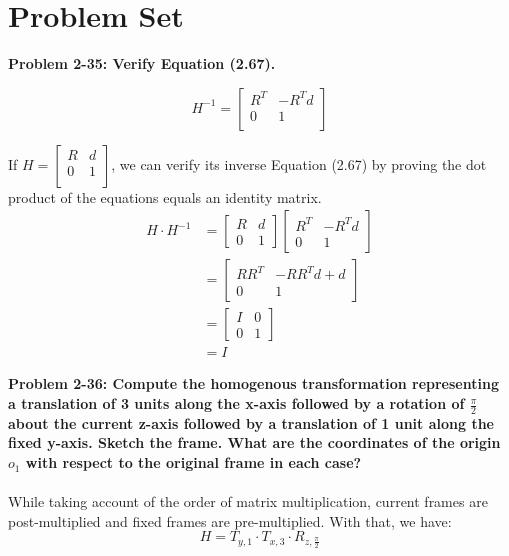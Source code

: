 \documentclass[12pt]{article}
\begin{document}
\section{Problem Set}

\textbf{Problem 2-35: Verify Equation (2.67).} 

\[
H^{-1} = 
\begin{bmatrix}
    R^T & -R^T d \\
    0 & 1 \\
\end{bmatrix}
\]

If $H = \begin{bmatrix} R & d \\ 0 & 1 \\ \end{bmatrix}$, we can verify its inverse Equation (2.67) 
by proving the dot product of the equations equals an identity matrix.
\begin{align*}
    H \cdot H^{-1} 
    &=
    \begin{bmatrix} R & d \\ 0 & 1 \end{bmatrix}
    \begin{bmatrix} R^T & -R^T d \\ 0 & 1 \end{bmatrix} \\
    &=
    \begin{bmatrix} RR^T & -RR^Td + d \\ 0 & 1 \end{bmatrix} \\
    &=
    \begin{bmatrix} I & 0 \\ 0 & 1 \end{bmatrix} \\
    &= I
\end{align*}

\textbf{Problem 2-36: Compute the homogenous transformation representing a translation of 3 units along the x-axis 
followed by a rotation of $\frac{\pi}{2}$ about the current z-axis followed by a translation of 1 
unit along the fixed y-axis. Sketch the frame. What are the coordinates of the origin $o_1$ with
respect to the original frame in each case?} \\\\
While taking account of the order of matrix multiplication, current frames are post-multiplied and
fixed frames are pre-multiplied. With that, we have:
\[H = T_{y,1} \cdot T_{x,3} \cdot R_{z,\frac{\pi}{2}}\]
\end{document}
